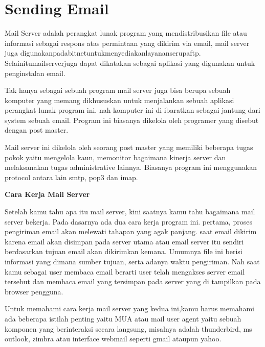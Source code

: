 
\section{Sending Email}
	Mail Server adalah perangkat lunak program yang mendistribusikan ﬁle atau informasi sebagai respons atas permintaan yang dikirim via email, mail server juga digunakanpadabitnetuntukmenyediakanlayananserupaftp. Selainitumailserverjuga dapat dikatakan sebagai aplikasi yang digunakan untuk penginstalan email.	\par \vspace{12pt}
	Tak hanya sebagai sebuah program mail server juga bisa berupa sebuah komputer yang memang dikhususkan untuk menjalankan sebuah aplikasi perangkat lunak program ini. nah komputer ini di ibaratkan sebagai jantung dari system sebuah email. Program ini biasanya dikelola oleh programer yang disebut dengan post master.	\par \vspace{12pt}
	Mail server ini dikelola oleh seorang post master yang memiliki beberapa tugas pokok yaitu mengelola kaun, memonitor bagaimana kinerja server dan melaksanakan tugas administrative lainnya. Biasanya program ini menggunakan protocol antara lain smtp, pop3 dan imap.	\par \vspace{12pt}
	
	\textbf{Cara Kerja Mail Server}	\par \vspace{12pt}
	
	Setelah kamu tahu apa itu mail server, kini saatnya kamu tahu bagaimana mail server bekerja. Pada dasarnya ada dua cara kerja program ini. pertama, proses pengiriman email akan melewati tahapan yang agak panjang. saat email dikirim karena email akan disimpan pada server utama atau email server itu sendiri berdasarkan tujuan email akan dikirimkan kemana. Umumnya file ini berisi informasi yang dimana sumber tujuan, serta adanya waktu pengiriman. Nah saat kamu sebagai user membaca email berarti user telah mengakses server email tersebut dan membaca email yang tersimpan pada server yang di tampilkan pada browser pengguna.	\par \vspace{12pt}
	
	Untuk memahami cara kerja mail server yang kedua ini,kamu harus memahami ada beberapa istilah penting yaitu MUA atau mail user agent yaitu sebuah komponen yang berinteraksi secara langsung, misalnya adalah thunderbird, ms outlook, zimbra atau interface webmail seperti gmail ataupun yahoo.	\par \vspace{12pt}
	

